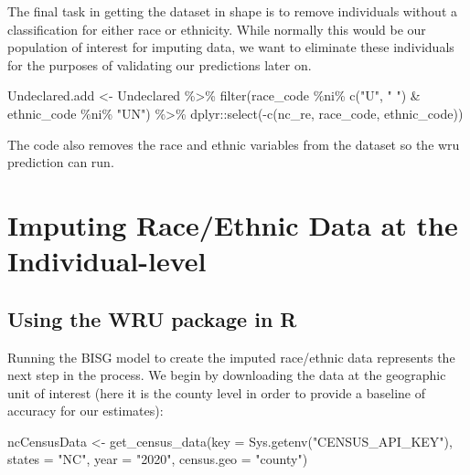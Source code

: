 \documentclass[
]{article}
\newenvironment{Shaded}{}{}
\newcommand{\AttributeTok}[1]{#1}
\newcommand{\FunctionTok}[1]{#1}
\newcommand{\NormalTok}[1]{#1}
\newcommand{\OtherTok}[1]{\textcolor[rgb]{1.00,0.25,0.00}{#1}}
\newcommand{\SpecialCharTok}[1]{\textcolor[rgb]{0.00,0.50,0.50}{#1}}
\newcommand{\StringTok}[1]{\textcolor[rgb]{0.00,0.50,0.50}{#1}}
\begin{document}
The final task in getting the dataset in shape is to remove individuals
without a classification for either race or ethnicity. While normally
this would be our population of interest for imputing data, we want to
eliminate these individuals for the purposes of validating our
predictions later on.

\begin{Shaded}
\begin{Highlighting}[]
\NormalTok{Undeclared.add }\OtherTok{\textless{}{-}}\NormalTok{ Undeclared }\SpecialCharTok{\%\textgreater{}\%} \FunctionTok{filter}\NormalTok{(race\_code }\SpecialCharTok{\%ni\%} \FunctionTok{c}\NormalTok{(}\StringTok{"U"}\NormalTok{, }\StringTok{" "}\NormalTok{) }\SpecialCharTok{\&} 
\NormalTok{                                        ethnic\_code }\SpecialCharTok{\%ni\%} \StringTok{"UN"}\NormalTok{) }\SpecialCharTok{\%\textgreater{}\%} 
\NormalTok{  dplyr}\SpecialCharTok{::}\FunctionTok{select}\NormalTok{(}\SpecialCharTok{{-}}\FunctionTok{c}\NormalTok{(nc\_re, race\_code, ethnic\_code)) }
\end{Highlighting}
\end{Shaded}

The code also removes the race and ethnic variables from the dataset so
the wru prediction can run.

\hypertarget{imputing-raceethnic-data-at-the-individual-level}{%
\section{Imputing Race/Ethnic Data at the
Individual-level}\label{imputing-raceethnic-data-at-the-individual-level}}

\hypertarget{using-the-wru-package-in-r}{%
\subsection{Using the WRU package in
R}\label{using-the-wru-package-in-r}}

Running the BISG model to create the imputed race/ethnic data represents
the next step in the process. We begin by downloading the data at the
geographic unit of interest (here it is the county level in order to
provide a baseline of accuracy for our estimates):

\begin{Shaded}
\begin{Highlighting}[]
\NormalTok{ncCensusData }\OtherTok{\textless{}{-}} \FunctionTok{get\_census\_data}\NormalTok{(}\AttributeTok{key =} \FunctionTok{Sys.getenv}\NormalTok{(}\StringTok{"CENSUS\_API\_KEY"}\NormalTok{),}
                \AttributeTok{states =} \StringTok{"NC"}\NormalTok{, }\AttributeTok{year =} \StringTok{"2020"}\NormalTok{, }\AttributeTok{census.geo =} \StringTok{"county"}\NormalTok{)}
\end{Highlighting}
\end{Shaded}
\end{document}
